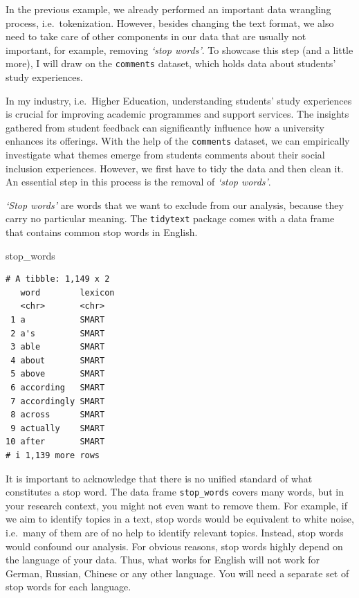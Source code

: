 \documentclass[
  letterpaper,
  DIV=11,
  numbers=noendperiod]{scrreprt}
\newenvironment{Shaded}{\begin{snugshade}}{\end{snugshade}}
\newcommand{\NormalTok}[1]{\textcolor[rgb]{0.00,0.23,0.31}{#1}}
\begin{document}
In the previous example, we already performed an important data
wrangling process, i.e.~tokenization. However, besides changing the text
format, we also need to take care of other components in our data that
are usually not important, for example, removing \emph{`stop words'}. To
showcase this step (and a little more), I will draw on the
\texttt{comments} dataset, which holds data about students' study
experiences.

In my industry, i.e.~Higher Education, understanding students' study
experiences is crucial for improving academic programmes and support
services. The insights gathered from student feedback can significantly
influence how a university enhances its offerings. With the help of the
\texttt{comments} dataset, we can empirically investigate what themes
emerge from students comments about their social inclusion experiences.
However, we first have to tidy the data and then clean it. An essential
step in this process is the removal of \emph{`stop words'}.

\emph{`Stop words'} are words that we want to exclude from our analysis,
because they carry no particular meaning. The \texttt{tidytext} package
comes with a data frame that contains common stop words in English.

\begin{Shaded}
\begin{Highlighting}[]
\NormalTok{stop\_words}
\end{Highlighting}
\end{Shaded}

\begin{verbatim}
# A tibble: 1,149 x 2
   word        lexicon
   <chr>       <chr>  
 1 a           SMART  
 2 a's         SMART  
 3 able        SMART  
 4 about       SMART  
 5 above       SMART  
 6 according   SMART  
 7 accordingly SMART  
 8 across      SMART  
 9 actually    SMART  
10 after       SMART  
# i 1,139 more rows
\end{verbatim}

It is important to acknowledge that there is no unified standard of what
constitutes a stop word. The data frame \texttt{stop\_words} covers many
words, but in your research context, you might not even want to remove
them. For example, if we aim to identify topics in a text, stop words
would be equivalent to white noise, i.e.~many of them are of no help to
identify relevant topics. Instead, stop words would confound our
analysis. For obvious reasons, stop words highly depend on the language
of your data. Thus, what works for English will not work for German,
Russian, Chinese or any other language. You will need a separate set of
stop words for each language.
\end{document}
